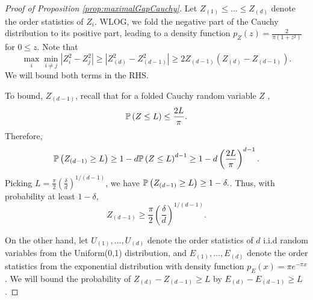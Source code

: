 \ICAmaximalGapCauchy*
\begin{proof}[Proof of Proposition \ref{prop:maximalGapCauchy}]
	Let $Z_{(1)}\le \ldots \le Z_{(d)}$ denote the order statistics of $Z_i$. 
	WLOG, we fold the negative part of the Cauchy distribution to its positive part, leading to a density function $p_Z(z) = \frac{2}{\pi (1+z^2)}$ for $0\le z$.
	Note that 
	\[
	\max_i \min_{i\neq j} |Z_i^2 - Z_j^2| \ge |Z_{(d)}^2 - Z_{(d-1)}^2| \ge 2Z_{(d-1)} \left(Z_{(d)} - Z_{(d-1)}\right).
	\]
	We will bound both terms in the RHS.
	
	To bound, $Z_{(d-1)}$, recall that for a folded Cauchy random variable $Z$ , %
	\[
	\Probp{Z \le L} \le \frac{2L}{\pi}.%
	\] 
	Therefore, %
	\[
	\mathbb{P}\left(Z_{(d-1)} \ge L\right) \ge 1-d\mathbb{P}\left(Z\le L\right)^{d-1} \ge 1- d\left(\frac{2L}{\pi}\right)^{d-1}.
	\]
	Picking $L = \frac{\pi}{2}\left(\frac{\delta}{d}\right)^{1/(d-1)}$, %
	we have $ \mathbb{P}\left(Z_{(d-1)} \ge L\right) \ge 1-\delta.$.
	Thus, with probability at least $1- \delta$, 
	\[
	Z_{(d-1)} \ge  \frac{\pi}{2}\left(\frac{\delta}{d}\right)^{1/(d-1)}.
	\]
	
	On the other hand, let $U_{(1)}, \ldots, U_{(d)}$ denote the order statistics of $d$ i.i.d random variables from the Uniform(0,1) distribution, and $E_{(1)}, \ldots, E_{(d)}$ denote the order statistics from the exponential distribution with density function $p_E(x) = \pi e^{-\pi x}$. 
	We will bound the probability of $Z_{(d)} - Z_{(d-1)} \ge L$ by $E_{(d)} - E_{(d-1)} \ge L$.
	

\end{proof}
